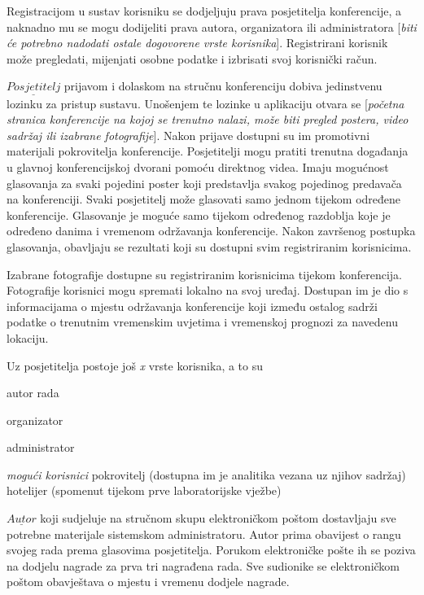 		Registracijom u sustav korisniku se dodjeljuju prava posjetitelja konferencije, a naknadno mu se mogu dodijeliti prava autora, organizatora ili administratora [\textit{biti će potrebno nadodati ostale dogovorene vrste korisnika}]. Registrirani korisnik može pregledati, mijenjati osobne podatke i izbrisati svoj korisnički račun.
		
		$\underline{Posjetitelj}$ prijavom i dolaskom na stručnu konferenciju dobiva jedinstvenu lozinku za pristup sustavu. Unošenjem te lozinke u aplikaciju otvara se [\textit{početna stranica konferencije na kojoj se trenutno nalazi, može biti pregled postera, video sadržaj ili izabrane fotografije}]. Nakon prijave dostupni su im promotivni materijali pokrovitelja konferencije. Posjetitelji mogu pratiti trenutna događanja u glavnoj konferencijskoj dvorani pomoću direktnog videa. Imaju mogućnost glasovanja za svaki pojedini poster koji predstavlja svakog pojedinog predavača na konferenciji. Svaki posjetitelj može glasovati samo jednom tijekom određene konferencije. Glasovanje je moguće samo tijekom određenog razdoblja koje je određeno danima i vremenom održavanja konferencije. Nakon završenog postupka glasovanja, obavljaju se rezultati koji su dostupni svim registriranim korisnicima. 
		
		Izabrane fotografije dostupne su registriranim korisnicima tijekom konferencija. Fotografije korisnici mogu spremati lokalno na svoj uređaj. Dostupan im je dio s informacijama o mjestu održavanja konferencije koji između ostalog sadrži podatke o trenutnim vremenskim uvjetima i vremenskoj prognozi za navedenu lokaciju.
		
		Uz posjetitelja postoje još \textit{x} vrste korisnika, a to su
		\begin{packed_item}
			\item autor rada
			\item organizator
			\item administrator
			\item \textit{mogući korisnici}
			\subitem pokrovitelj (dostupna im je analitika vezana uz njihov sadržaj)
			\subitem hotelijer (spomenut tijekom prve laboratorijske vježbe)
		\end{packed_item}
		
		$\underline{Autor}$ koji sudjeluje na stručnom skupu elektroničkom poštom dostavljaju sve potrebne materijale sistemskom administratoru. Autor prima obavijest o rangu svojeg rada prema glasovima posjetitelja. Porukom elektroničke pošte ih se poziva na dodjelu nagrade za prva tri nagrađena rada. Sve sudionike se elektroničkom poštom obavještava o mjestu i vremenu dodjele nagrade.
		
